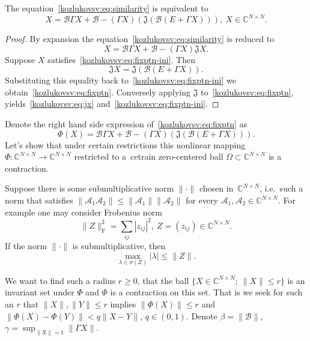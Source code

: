 \begin{lem}
    The equation~\eqref{kozlukovsv:eq:similarity} is equivalent to
    \begin{equation}\label{kozlukovsv:eq:fixptn}
        X = \mathcal{B} \Gamma X + \mathcal{B} - (\Gamma X)(\mathfrak{J}(\mathcal{B} (E + \Gamma X))),\ X\in\mathbb{C}^{N{\times}N}.
    \end{equation}
\end{lem}
\begin{proof}
By expansion the equation~\eqref{kozlukovsv:eq:similarity} is reduced to
\begin{equation}\label{kozlukovsv:eq:fixptn-ini}
    X = \mathcal{B} \Gamma X + \mathcal{B} - (\Gamma X) \mathfrak{J} X.
\end{equation}
Suppose \( X \) satisfies~\eqref{kozlukovsv:eq:fixptn-ini}.
Then
    \begin{equation}\label{kozlukovsv:eq:jx}
        \mathfrak{J} X = \mathfrak{J}(\mathcal{B} (E + \Gamma X)).
    \end{equation}
Substituting this equality back to~\eqref{kozlukovsv:eq:fixptn-ini}
    we obtain~\eqref{kozlukovsv:eq:fixptn}.
Conversely applying \( \mathfrak{J} \) to~\eqref{kozlukovsv:eq:fixptn},
    yields~\eqref{kozlukovsv:eq:jx} and~\eqref{kozlukovsv:eq:fixptn-ini}.
\end{proof}

Denote the right hand side expression of~\eqref{kozlukovsv:eq:fixptn} as
\[
    \Phi(X) = \mathcal{B} \Gamma X + \mathcal{B} - (\Gamma X)(\mathfrak{J}(\mathcal{B} (E + \Gamma X))).
    \]
Let's show that under certain restrictions
    this nonlinear mapping \( \Phi:\mathbb{C}^{N{\times}N}{\to}\mathbb{C}^{N{\times}N} \)
    restricted to a~cetrain zero-centered ball \( \Omega \subset \mathbb{C}^{N{\times}N} \)
    is a contraction.

Suppose there is some submultiplicative norm \( \|\cdot\| \) chosen in~\( \mathbb{C}^{N{\times}N} \),
    i.e.\ such a norm that satisfies
    \( \| \mathcal{A}_1\mathcal{A}_2 \| \leq \|\mathcal{A}_1\|\|\mathcal{A}_2\| \)
    for every \( \mathcal{A}_1, \mathcal{A}_2 \in \mathbb{C}^{N{\times}N} \).
For example one may consider Frobenius norm
\[
    \|Z\|_{\mathrm{F}}^2 = \sum_{ij}|z_{ij}|^2,\ Z=(z_{ij})\in\mathbb{C}^{N{\times}N}.
    \]
If the norm \( \|\cdot\| \) is submultiplicative,
    then
\[
    \max_{\lambda\in\sigma(Z)}|\lambda| \leq \|Z\|.
    \]


We want to find such a radius \( r \geq 0 \),
    that the ball \( \{ X{\in}\mathbb{C}^{N{\times}N};\ \|X\|{\leq}r \} \)
    is an invariant set under \( \Phi \)
    and \( \Phi \) is a contraction on this set.
That is we seek for such an \( r \)
    that \( \|X\|,\|Y\| \leq r \) implies \( \|\Phi(X)\| \leq r \)
and~\( \|\Phi(X) - \Phi(Y)\| < q\|X-Y\| \), \( q\in(0,1) \).
Denote
\( \beta = \|\mathcal{B}\| \), \( \gamma = \sup_{\|X\|=1} \|\Gamma X\| \).


